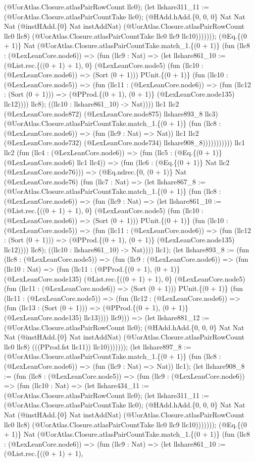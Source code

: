 \documentclass[11pt]{article}
\begin{document}
(@UorAtlas.Closure.atlasPairRowCount llc0); (let llshare311\_11 := (@UorAtlas.Closure.atlasPairCountTake llc0); (@HAdd.hAdd.\{0, 0, 0\} Nat Nat Nat (@instHAdd.\{0\} Nat instAddNat) (@UorAtlas.Closure.atlasPairRowCount llc0 llc8) (@UorAtlas.Closure.atlasPairCountTake llc0 llc9 llc10))))))); (@Eq.\{(0 + 1)\} Nat (@UorAtlas.Closure.atlasPairCountTake.match\_1.\{(0 + 1)\} (fun (llc8 : (@LexLeanCore.node6)) => (fun (llc9 : Nat) => (let llshare861\_10 := (@List.rec.\{((0 + 1) + 1), 0\} (@LexLeanCore.node5) (fun (llc10 : (@LexLeanCore.node6)) => (Sort (0 + 1))) PUnit.\{(0 + 1)\} (fun (llc10 : (@LexLeanCore.node5)) => (fun (llc11 : (@LexLeanCore.node6)) => (fun (llc12 : (Sort (0 + 1))) => (@PProd.\{(0 + 1), (0 + 1)\} (@LexLeanCore.node135) llc12)))) llc8); ((llc10 : llshare861\_10) -> Nat)))) llc1 llc2 (@LexLeanCore.node872) (@LexLeanCore.node875) llshare893\_8 llc3) (@UorAtlas.Closure.atlasPairCountTake.match\_1.\{(0 + 1)\} (fun (llc8 : (@LexLeanCore.node6)) => (fun (llc9 : Nat) => Nat)) llc1 llc2 (@LexLeanCore.node732) (@LexLeanCore.node734) llshare908\_8))))))))))) llc1 llc2 (fun (llc4 : (@LexLeanCore.node6)) => (fun (llc5 : (@Eq.\{(0 + 1)\} (@LexLeanCore.node6) llc1 llc4)) => (fun (llc6 : (@Eq.\{(0 + 1)\} Nat llc2 (@LexLeanCore.node76))) => (@Eq.ndrec.\{0, (0 + 1)\} Nat (@LexLeanCore.node76) (fun (llc7 : Nat) => (let llshare867\_8 := (@UorAtlas.Closure.atlasPairCountTake.match\_1.\{(0 + 1)\} (fun (llc8 : (@LexLeanCore.node6)) => (fun (llc9 : Nat) => (let llshare861\_10 := (@List.rec.\{((0 + 1) + 1), 0\} (@LexLeanCore.node5) (fun (llc10 : (@LexLeanCore.node6)) => (Sort (0 + 1))) PUnit.\{(0 + 1)\} (fun (llc10 : (@LexLeanCore.node5)) => (fun (llc11 : (@LexLeanCore.node6)) => (fun (llc12 : (Sort (0 + 1))) => (@PProd.\{(0 + 1), (0 + 1)\} (@LexLeanCore.node135) llc12)))) llc8); ((llc10 : llshare861\_10) -> Nat)))) llc1); (let llshare893\_8 := (fun (llc8 : (@LexLeanCore.node5)) => (fun (llc9 : (@LexLeanCore.node6)) => (fun (llc10 : Nat) => (fun (llc11 : (@PProd.\{(0 + 1), (0 + 1)\} (@LexLeanCore.node135) (@List.rec.\{((0 + 1) + 1), 0\} (@LexLeanCore.node5) (fun (llc11 : (@LexLeanCore.node6)) => (Sort (0 + 1))) PUnit.\{(0 + 1)\} (fun (llc11 : (@LexLeanCore.node5)) => (fun (llc12 : (@LexLeanCore.node6)) => (fun (llc13 : (Sort (0 + 1))) => (@PProd.\{(0 + 1), (0 + 1)\} (@LexLeanCore.node135) llc13)))) llc9))) => (let llshare881\_12 := (@UorAtlas.Closure.atlasPairRowCount llc0); (@HAdd.hAdd.\{0, 0, 0\} Nat Nat Nat (@instHAdd.\{0\} Nat instAddNat) (@UorAtlas.Closure.atlasPairRowCount llc0 llc8) (((PProd.fst llc11)) llc10))))))); (let llshare897\_8 := (@UorAtlas.Closure.atlasPairCountTake.match\_1.\{(0 + 1)\} (fun (llc8 : (@LexLeanCore.node6)) => (fun (llc9 : Nat) => Nat)) llc1); (let llshare908\_8 := (fun (llc8 : (@LexLeanCore.node5)) => (fun (llc9 : (@LexLeanCore.node6)) => (fun (llc10 : Nat) => (let llshare434\_11 := (@UorAtlas.Closure.atlasPairRowCount llc0); (let llshare311\_11 := (@UorAtlas.Closure.atlasPairCountTake llc0); (@HAdd.hAdd.\{0, 0, 0\} Nat Nat Nat (@instHAdd.\{0\} Nat instAddNat) (@UorAtlas.Closure.atlasPairRowCount llc0 llc8) (@UorAtlas.Closure.atlasPairCountTake llc0 llc9 llc10))))))); (@Eq.\{(0 + 1)\} Nat (@UorAtlas.Closure.atlasPairCountTake.match\_1.\{(0 + 1)\} (fun (llc8 : (@LexLeanCore.node6)) => (fun (llc9 : Nat) => (let llshare861\_10 := (@List.rec.\{((0 + 1) + 1), 
\end{document}
